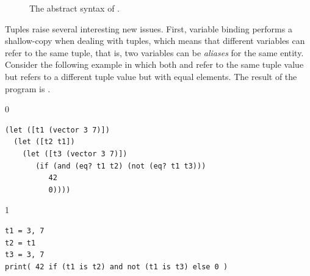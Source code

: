 \documentclass[7x10,nocrop]{TimesAPriori_MIT}%
\newcommand{\gray}[1]{{\color{gray} #1}}
\def\racketEd{0}
\def\pythonEd{1}
\def\edition{1}
\begin{document}
\begin{figure}[tp]
\centering
\fbox{
\begin{minipage}{0.96\textwidth}
{\if\edition\racketEd    
\[
\begin{array}{l}
  \gray{\LintOpAST} \\ \hline
  \gray{\LvarASTRacket{}} \\ \hline
  \gray{\LifASTRacket{}} \\ \hline
  \gray{\LwhileASTRacket{}} \\ \hline
  \LtupASTRacket{} \\
\begin{array}{lcl}
  \LangVecM{} &::=& \PROGRAM{\key{'()}}{\Exp}
\end{array}
\end{array}
\]
\fi}
{\if\edition\pythonEd
\[
\begin{array}{l}
  \gray{\LintASTPython} \\ \hline
  \gray{\LvarASTPython} \\ \hline
  \gray{\LifASTPython} \\ \hline
  \gray{\LwhileASTPython} \\ \hline
  \LtupASTPython \\
  \begin{array}{lcl}
    \LangLoopM{} &::=& \PROGRAM{\code{'()}}{\Stmt^{*}}
  \end{array}
\end{array}
\]
\fi}
\end{minipage}
}
\caption{The abstract syntax of \LangVec{}.}
\label{fig:Lvec-syntax}
\end{figure}

Tuples raise several interesting new issues.  First, variable binding
performs a shallow-copy when dealing with tuples, which means that
different variables can refer to the same tuple, that is, two
variables can be \emph{aliases} for the same
entity. Consider the following example in which both  and
 refer to the same tuple value but  refers to a
different tuple value but with equal elements. The result of the
program is .


\begin{center}
\begin{minipage}{0.96\textwidth}
{\if\edition\racketEd        
\begin{lstlisting}
(let ([t1 (vector 3 7)])
  (let ([t2 t1])
    (let ([t3 (vector 3 7)])
       (if (and (eq? t1 t2) (not (eq? t1 t3)))
          42
          0))))
\end{lstlisting}
\fi}
{\if\edition\pythonEd
\begin{lstlisting}
t1 = 3, 7
t2 = t1
t3 = 3, 7
print( 42 if (t1 is t2) and not (t1 is t3) else 0 )
\end{lstlisting}
\fi}
\end{minipage}
\end{center}
\end{document}
